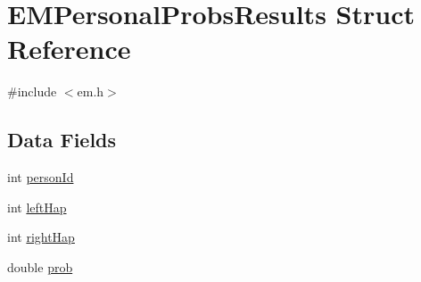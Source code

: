 \hypertarget{structEMPersonalProbsResults}{
\section{EMPersonalProbsResults Struct Reference}
\label{structEMPersonalProbsResults}
}


{\ttfamily \#include $<$em.h$>$}

\subsection*{Data Fields}
\begin{DoxyCompactItemize}
\item 
int \hyperlink{structEMPersonalProbsResults_ad656d2e7ccb659689b21016c28b58ff4}{personId}
\item 
int \hyperlink{structEMPersonalProbsResults_ae4a36f80c0146b7c5b712fb2d6d71138}{leftHap}
\item 
int \hyperlink{structEMPersonalProbsResults_a3bacb2357ef66f91aeb3feffe1666e92}{rightHap}
\item 
double \hyperlink{structEMPersonalProbsResults_ae9e07e1bcc31ff1622b96dcc8f5e86d1}{prob}
\end{DoxyCompactItemize}


